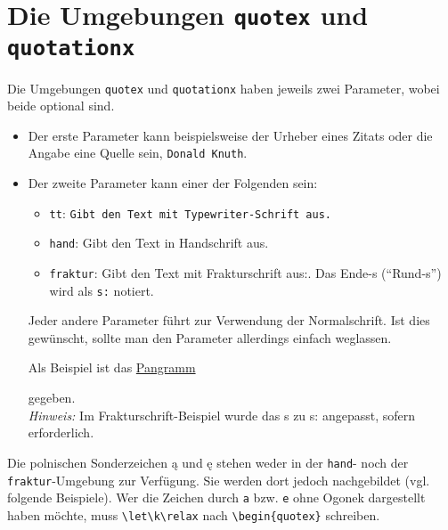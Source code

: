 			
		\section{Die Umgebungen \texttt{quotex} und \texttt{quotationx}}
			\label{quotex_quotationx}
			
			Die Umgebungen \texttt{quotex} und \texttt{quotationx} haben jeweils zwei Parameter, wobei beide optional sind.
			\begin{itemize}
				\item Der erste Parameter kann beispielsweise der Urheber eines Zitats oder die Angabe eine Quelle sein, \zb \texttt{Donald Knuth}.
				\item Der zweite Parameter kann einer der Folgenden sein:
					\begin{itemize}
						\item \texttt{tt}: {\tt Gibt den Text mit Typewriter-Schrift aus.}
						\item \texttt{hand}: {\oeschfamily Gibt den Text in Handschrift aus.}
						\item \texttt{fraktur}: {\frakfamily Gibt den Text mit Frakturschrift aus:.} Das Ende-s ("`Rund-s"') wird als \verb|s:| notiert.
					\end{itemize}
					Jeder andere Parameter führt zur Verwendung der Normalschrift. Ist dies gewünscht, sollte man den Parameter allerdings einfach weglassen. 
					
					\newpage
					Als Beispiel ist das \href{https://de.wikipedia.org/wiki/Pangramm\#Liste_deutscher_Pangramme}{Pangramm} 
					\begin{quote}
						\pangramm
					\end{quote}
					gegeben.\\
					\emph{Hinweis:} Im Frakturschrift-Beispiel wurde das {\frakfamily s} zu {\frakfamily s:} angepasst, sofern erforderlich.
			\end{itemize}
			
			\begin{redbox}
				Die polnischen Sonderzeichen \k a und \k e stehen weder in der \texttt{hand}- noch der \texttt{fraktur}-Umgebung zur Verfügung. Sie werden dort jedoch nachgebildet (vgl. folgende Beispiele). Wer die Zeichen durch \texttt{a} bzw. \texttt{e} ohne Ogonek dargestellt haben möchte, muss \verb|\let\k\relax| nach \texttt{\textbackslash begin\{quotex\}} schreiben. 
			\end{redbox}
			
